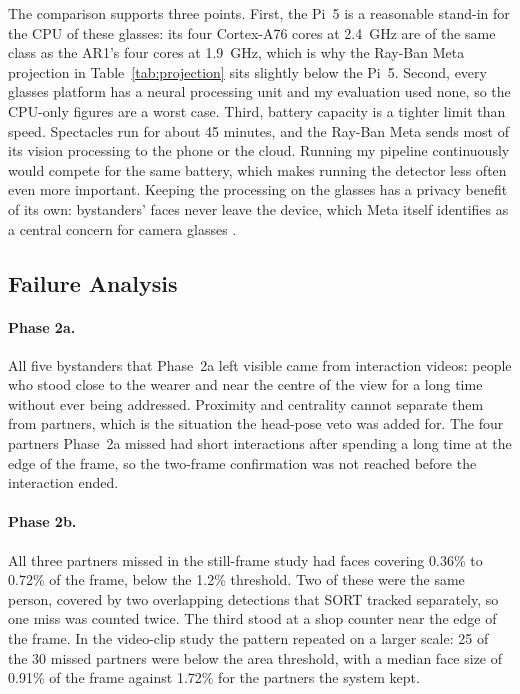 The comparison supports three points. First, the Pi~5 is a reasonable stand-in for the CPU
of these glasses: its four Cortex-A76 cores at 2.4~GHz are of the same class as the AR1's
four cores at 1.9~GHz, which is why the Ray-Ban Meta projection in
Table~\ref{tab:projection} sits slightly below the Pi~5. Second, every glasses platform
has a neural processing unit and my evaluation used none, so the CPU-only figures are a
worst case. Third, battery capacity is a tighter limit than speed. Spectacles run for
about 45 minutes, and the Ray-Ban Meta sends most of its vision processing to the phone or the cloud. Running my pipeline continuously would compete for the
same battery, which makes running the detector less often even more important. Keeping the
processing on the glasses has a privacy benefit of its own: bystanders' faces never leave
the device, which Meta itself identifies as a central concern for camera glasses
\cite{meta_bystander}.

\subsection{Failure Analysis}
\label{sec:disc_failures}

\paragraph{Phase 2a.}
All five bystanders that Phase~2a left visible came from interaction videos: people who
stood close to the wearer and near the centre of the view for a long time without ever
being addressed. Proximity and centrality cannot
separate them from partners, which is the situation the head-pose veto was added for. The
four partners Phase~2a missed had short interactions after spending a long time at the
edge of the frame, so the two-frame confirmation was not reached before the interaction
ended.

\paragraph{Phase 2b.}
All three partners missed in the still-frame study had faces covering 0.36\% to 0.72\% of
the frame, below the 1.2\% threshold. Two of these were the same person, covered by two
overlapping detections that SORT tracked separately, so one miss was counted twice. The
third stood at a shop counter near the edge of the frame. In the video-clip study the
pattern repeated on a larger scale: 25 of the 30 missed partners were below the area
threshold, with a median face size of 0.91\% of the frame against 1.72\% for the partners
the system kept.

